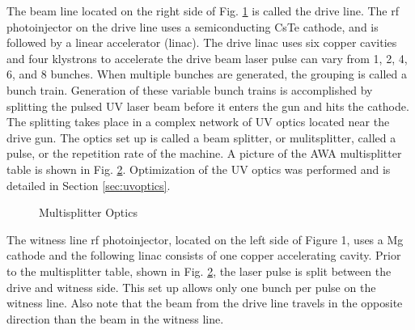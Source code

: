 \documentclass{iitthesis}
\begin{document}
The beam line located on the right side of Fig. \ref{fig:bunker} is called the
drive line. The rf photoinjector on the drive line uses a semiconducting
CsTe cathode, and is followed by a linear accelerator (linac). The
drive linac uses six copper cavities and four klystrons to accelerate the drive beam
laser pulse can vary from 1, 2, 4, 6, and 8 bunches. When multiple bunches
are generated, the grouping is called a bunch train. Generation of
these variable bunch trains is accomplished by splitting the pulsed
UV laser beam before it enters the gun and hits the cathode. The splitting
takes place in a complex network of UV optics located near the drive
gun. The optics set up is called a beam splitter, or mulitsplitter,
called a pulse, or the repetition rate of the machine. A picture of
the AWA multisplitter table is shown in Fig. \ref{fig:optics}. Optimization 
of the UV optics was performed and is detailed in Section \ref{sec:uvoptics}.  
\begin{figure}
	\begin{center}
		\label{fig:bunker}
	\end{center}
\end{figure}
\begin{figure}
	\begin{center}
		\caption{Multisplitter Optics}
		\label{fig:optics}
	\end{center}
\end{figure}

The witness line rf photoinjector, located on the left side of Figure
1, uses a Mg cathode and the following linac consists of one copper
accelerating cavity. Prior to the multisplitter table, shown in
Fig. \ref{fig:optics}, the laser pulse is split between the drive and witness side.
This set up allows only one bunch per pulse on the witness line. Also
note that the beam from the drive line travels in the opposite direction
than the beam in the witness line. 

 \label{sec:requirements}
\end{document}
